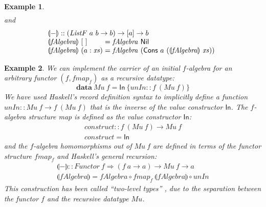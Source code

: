 \documentclass{jfp1}
\newcommand{\fold}[1]{\llparenthesis #1 \rrparenthesis}
\newtheorem{example}{Example}
\newcommand{\kw}[1]{\textbf{#1}}
\begin{document}
\begin{example}
\begin{displaymath}
\begin{array}{l}
    \end{array}
  \end{displaymath}
  and
  \begin{displaymath}
    \begin{array}[t]{l}
      \fold{-} :: (\mathit{ListF}~a~b \to b) \to [a] \to b \\
      \begin{array}{@{}l@{\hspace{0.3em}}l@{\hspace{0.3em}}c@{\hspace{0.3em}}l}
        \fold{\mathit{fAlgebra}}&[~]&=&\mathit{fAlgebra}~\mathsf{Nil} \\
        \fold{\mathit{fAlgebra}}&(a : \mathit{xs})&=&\mathit{fAlgebra}~(\mathsf{Cons}~a~(\fold{\mathit{fAlgebra}}~\mathit{xs}))
      \end{array}
    \end{array}
  \end{displaymath}
\end{example}

\begin{example}
  We can implement the carrier of an initial $f$-algebra for an arbitrary
  functor $(f, \mathit{fmap}_f)$ as a recursive datatype:
  \begin{displaymath}
    \kw{data}~\mathit{Mu}~f = \mathsf{In}~\{ \mathit{unIn} :: f~(\mathit{Mu}~f) \}
  \end{displaymath}
  We have used Haskell's record definition syntax to implicitly define
  a function $\mathit{unIn} :: \mathit{Mu}~f \to f~(\mathit{Mu}~f)$
  that is the inverse of the value constructor $\mathsf{In}$.  The
  $f$-algebra structure map is defined as the value
  constructor $\mathsf{In}$:
  \begin{displaymath}
    \begin{array}{l}
      \mathit{construct} :: f~(\mathit{Mu}~f) \to \mathit{Mu}~f \\
      \mathit{construct} = \mathsf{In}
    \end{array}
  \end{displaymath}
  and the $f$-algebra homomorphisms out of $\mathit{Mu}~f$ are defined
  in terms of the functor structure $\mathit{fmap}_f$ and Haskell's
  general recursion:
  \begin{displaymath}
    \begin{array}{l}
      \fold{-} :: \mathit{Functor}~f \Rightarrow (f~a \to a) \to \mathit{Mu}~f \to a \\
      \fold{\mathit{fAlgebra}} = \mathit{fAlgebra} \circ \mathit{fmap}_f~\fold{\mathit{fAlgebra}} \circ \mathit{unIn}
    \end{array}
  \end{displaymath}
  This construction has been called ``two-level types''
  \cite{sheard04twolevel}, due to the separation between the functor
  $f$ and the recursive datatype $\mathit{Mu}$.
\end{example}
\end{document}
